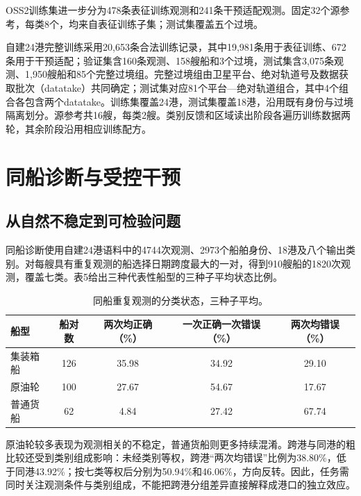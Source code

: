 \documentclass[journal,10pt,a4paper]{IEEEtran}
\begin{document}
OSS2训练集进一步分为478条表征训练观测和241条干预适配观测。固定32个源参考，每类8个，均来自表征训练子集；测试集覆盖五个过境。

自建24港完整训练采用20,653条合法训练记录，其中19,981条用于表征训练、672条用于干预适配；验证集含160条观测、158艘船和3个过境，测试集含3,075条观测、1,950艘船和85个完整过境组。完整过境组由卫星平台、绝对轨道号及数据获取批次（datatake）共同确定；测试集对应81个平台---绝对轨道组合，其中4个组合各包含两个datatake。训练集覆盖24港，测试集覆盖18港，沿用既有身份与过境隔离划分。源参考共16艘，每类2艘。类别反馈和区域读出阶段各遍历训练数据两轮，其余阶段沿用相应训练配方。

\section{同船诊断与受控干预}\label{ux540cux8239ux8bcaux65adux4e0eux53d7ux63a7ux5e72ux9884}

\subsection{从自然不稳定到可检验问题}\label{ux4eceux81eaux7136ux4e0dux7a33ux5b9aux5230ux53efux68c0ux9a8cux95eeux9898}

同船诊断使用自建24港语料中的4744次观测、2973个船舶身份、18港及八个输出类别。对每艘具有重复观测的船选择日期跨度最大的一对，得到910艘船的1820次观测，覆盖七类。表5给出三种代表性船型的三种子平均状态比例。

\begin{table}[!t]
\centering\footnotesize
\setcounter{table}{4}
\caption{同船重复观测的分类状态，三种子平均。}
\label{tab:5}
\setlength{\tabcolsep}{3pt}\renewcommand{\arraystretch}{1.2}
\begin{tabularx}{\linewidth}{LCCCC}
\toprule
船型 & 船对数 & 两次均正确（\%） & 一次正确一次错误（\%） & 两次均错误（\%） \\
\midrule
集装箱船 & 126 & 35.98 & 34.92 & 29.10 \\
原油轮 & 100 & 27.67 & 54.67 & 17.67 \\
普通货船 & 62 & 4.84 & 27.42 & 67.74 \\
\bottomrule
\end{tabularx}
\end{table}

原油轮较多表现为观测相关的不稳定，普通货船则更多持续混淆。跨港与同港的粗比较还受到类别组成影响：未经类别等权，跨港``两次均错误''比例为38.80\%，低于同港43.92\%；按七类等权后分别为50.94\%和46.06\%，方向反转。因此，任务需同时关注观测条件与类别组成，不能把跨港分组差异直接解释成港口的独立效应。
\end{document}
